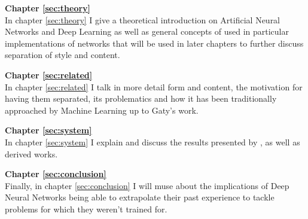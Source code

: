 \textbf{Chapter \ref{sec:theory}} \\[0.2em]
In chapter \ref{sec:theory} I give a theoretical introduction on Artificial Neural Networks and Deep Learning as well as general concepts of used in particular implementations of networks that will be used in later chapters to further discuss separation of style and content.

\textbf{Chapter \ref{sec:related}} \\[0.2em]
In chapter \ref{sec:related} I talk in more detail form and content, the motivation for having them separated, its problematics and how it has been traditionally approached by Machine Learning up to Gaty's work.

\textbf{Chapter \ref{sec:system}} \\[0.2em]
In chapter \ref{sec:system} I explain and discuss the results presented by \citet{Gatys2015}, as well as derived works.

\textbf{Chapter \ref{sec:conclusion}} \\[0.2em]
Finally, in chapter \ref{sec:conclusion} I will muse about the implications of Deep Neural Networks being able to extrapolate their past experience to tackle problems for which they weren't trained for.
